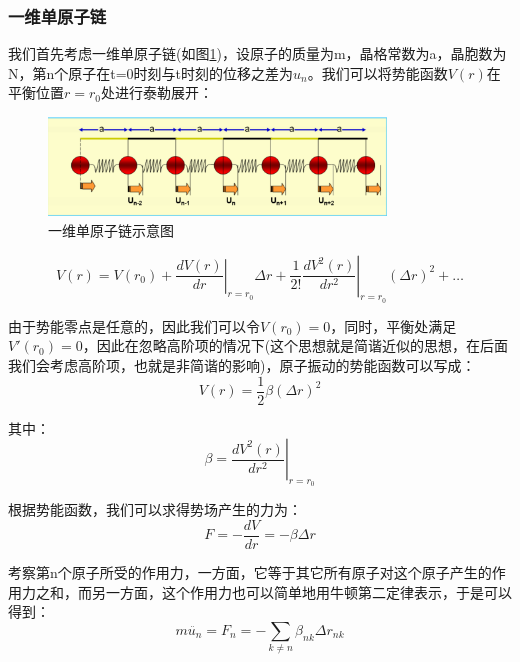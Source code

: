 \documentclass{ctexart}
\begin{document}
            \subsubsection{一维单原子链}   
            我们首先考虑一维单原子链(如图\ref{fig:1Dmonoatomic})，设原子的质量为m，晶格常数为a，晶胞数为N，第n个原子在t=0时刻与t时刻的位移之差为$u_n$。我们可以将势能函数$V(r)$在平衡位置$r=r_0$处进行泰勒展开：
            \begin{figure}[H]
                \centering
                \includegraphics[width=0.8\textwidth]{figure/1Dmonoatomic.png}
                \caption{一维单原子链示意图}
                \label{fig:1Dmonoatomic}
            \end{figure}
            
            \begin{equation}
                V(r)=V(r_0)+\left.\frac{dV(r)}{dr}\right|_{r=r_0}\Delta r+\frac{1}{2!}\left.\frac{dV^2(r)}{dr^2}\right|_{r=r_0}(\Delta r)^2+\dots
            \end{equation}
            
            由于势能零点是任意的，因此我们可以令$V(r_0)=0$，同时，平衡处满足$V'(r_0)=0$，因此在忽略高阶项的情况下(这个思想就是简谐近似的思想，在后面我们会考虑高阶项，也就是非简谐的影响)，原子振动的势能函数可以写成：
            \begin{equation}
                V(r)=\frac{1}{2}\beta (\Delta r)^2
            \end{equation}
            
            其中：
            \begin{equation}
                \beta=\left.\frac{dV^2(r)}{dr^2}\right|_{r=r_0}
            \end{equation}

            根据势能函数，我们可以求得势场产生的力为：
            \begin{equation}
                F=-\frac{dV}{dr}=-\beta\Delta r
            \end{equation}

            考察第n个原子所受的作用力，一方面，它等于其它所有原子对这个原子产生的作用力之和，而另一方面，这个作用力也可以简单地用牛顿第二定律表示，于是可以得到：
            \begin{equation}
                m\ddot{u_n}=F_n=-\sum_{k\ne n}\beta_{nk}\Delta r_{nk}
            \end{equation}
            
\end{document}
